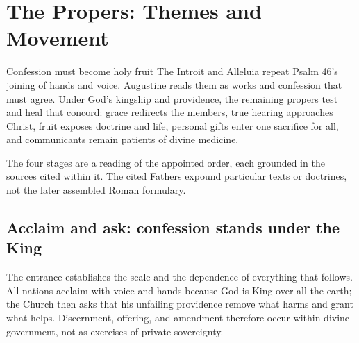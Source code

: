 \section*{The Propers: Themes and Movement}

\begin{massbox}{Confession must become holy fruit}
The Introit and Alleluia repeat Psalm 46's joining of hands and voice. Augustine reads them as works and confession that must agree. Under God's kingship and providence, the remaining propers test and heal that concord: grace redirects the members, true hearing approaches Christ, fruit exposes doctrine and life, personal gifts enter one sacrifice for all, and communicants remain patients of divine medicine.
\end{massbox}

\begin{center}
\end{center}

\noindent The four stages are a reading of the appointed order, each grounded in the sources cited within it. The cited Fathers expound particular texts or doctrines, not the later assembled Roman formulary.

\subsection*{Acclaim and ask: confession stands under the King\enspace{}}

The entrance establishes the scale and the dependence of everything that follows. All nations acclaim with voice and hands because God is King over all the earth; the Church then asks that his unfailing providence remove what harms and grant what helps. Discernment, offering, and amendment therefore occur within divine government, not as exercises of private sovereignty.

